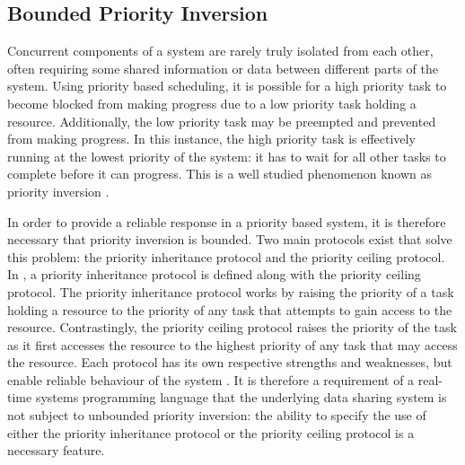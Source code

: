\subsection{Bounded Priority Inversion}
Concurrent components of a system are rarely truly isolated from each other,
often requiring some shared information or data between different parts of the
system.  Using priority based scheduling, it is possible for a high priority
task to become blocked from making progress due to a low priority task holding
a resource. Additionally, the low priority task may be preempted and prevented
from making progress. In this instance, the high priority task is effectively
running at the lowest priority of the system: it has to wait for all other
tasks to complete before it can progress. This is a well studied phenomenon
known as priority inversion \cite{real-time-systems}.  
\par\bigskip\noindent
In
order to provide a reliable response in a priority based system, it is
therefore necessary that priority inversion is bounded.  Two main protocols
exist that solve this problem: the priority inheritance protocol and the
priority ceiling protocol.  In \cite{57058}, a priority inheritance protocol is
defined along with the priority ceiling protocol.  The priority inheritance
protocol works by raising the priority of a task holding a resource to the
priority of any task that attempts to gain access to the resource.
Contrastingly, the priority ceiling protocol raises the priority of the task as
it first accesses the resource to the highest priority of any task that may
access the resource.  Each protocol has its own respective strengths and
weaknesses, but enable reliable behaviour of the system \cite{mall2009real}.
It is therefore a requirement of a real-time systems programming language that
the underlying data sharing system is not subject to unbounded priority
inversion: the ability to specify the use of either the priority inheritance
protocol or the priority ceiling protocol is a necessary feature.  

